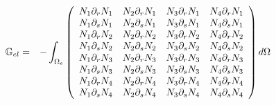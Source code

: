 \begin{eqnarray}
{\mathbb{G}}_{el} 
&=&
-\int_{\Omega_e}
\left(
\begin{array}{cccc}
N_1\partial_r N_1 & N_2\partial_r N_1 & N_3\partial_r N_1 & N_4\partial_r N_1 \\
N_1\partial_s N_1 & N_2\partial_s N_1 & N_3\partial_s N_1 & N_4\partial_s N_1 \\
N_1\partial_r N_2 & N_2\partial_r N_2 & N_3\partial_r N_2 & N_4\partial_r N_2 \\
N_1\partial_s N_2 & N_2\partial_s N_2 & N_3\partial_s N_2 & N_4\partial_s N_2 \\
N_1\partial_r N_3 & N_2\partial_r N_3 & N_3\partial_r N_3 & N_4\partial_r N_3 \\
N_1\partial_s N_3 & N_2\partial_s N_3 & N_3\partial_s N_3 & N_4\partial_s N_3 \\
N_1\partial_r N_4 & N_2\partial_r N_4 & N_3\partial_r N_4 & N_4\partial_r N_4 \\
N_1\partial_s N_4 & N_2\partial_s N_4 & N_3\partial_s N_4 & N_4\partial_s N_4 
\end{array}
\right)
d\Omega 
\end{eqnarray}


